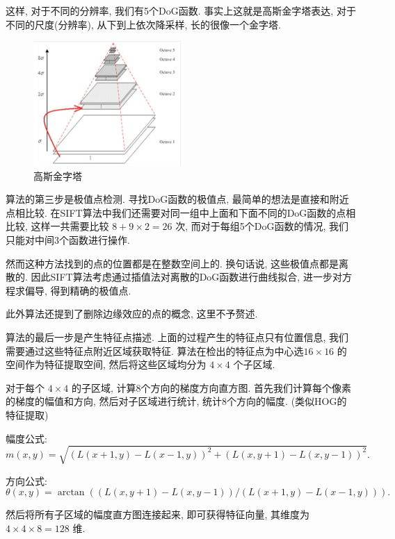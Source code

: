 \documentclass[lang=cn,12pt,a4paper,cite=authoryear]{elegantpaper}
\begin{document}
这样, 对于不同的分辨率, 我们有5个DoG函数. 事实上这就是高斯金字塔表达, 对于不同的尺度(分辨率), 从下到上依次降采样, 长的很像一个金字塔.
\begin{figure}[h]
    \centering
    \includegraphics[width=0.5\textwidth]{lateximgs/1.png}
    \caption{高斯金字塔}
    \label{fig:example}
\end{figure}

算法的第三步是极值点检测. 寻找DoG函数的极值点, 最简单的想法是直接和附近点相比较. 在SIFT算法中我们还需要对同一组中上面和下面不同的DoG函数的点相比较, 这样一共需要比较 $8+9\times2=26$ 次, 而对于每组5个DoG函数的情况, 我们只能对中间3个函数进行操作.

然而这种方法找到的点的位置都是在整数空间上的. 换句话说, 这些极值点都是离散的. 因此SIFT算法考虑通过插值法对离散的DoG函数进行曲线拟合, 进一步对方程求偏导, 得到精确的极值点.

此外算法还提到了删除边缘效应的点的概念, 这里不予赘述.

算法的最后一步是产生特征点描述. 上面的过程产生的特征点只有位置信息, 我们需要通过这些特征点附近区域获取特征. 算法在检出的特征点为中心选$16\times16$ 的空间作为特征提取空间, 然后将这些区域均分为 $4 \times 4$ 个子区域. 

对于每个 $4 \times 4$ 的子区域, 计算8个方向的梯度方向直方图. 首先我们计算每个像素的梯度的幅值和方向, 然后对子区域进行统计, 统计8个方向的幅度. (类似HOG的特征提取)

幅度公式:
\begin{equation*}
    m(x, y) = \sqrt{\left(L(x+1, y)-L(x-1, y)\right)^2+\left(L(x, y+1)-L(x, y-1)\right)^2}.
\end{equation*}

方向公式:
\begin{equation*}
    \theta(x, y) = \arctan\left((L(x, y+1)-L(x, y-1))/(L(x+1, y)-L(x-1, y))\right).
\end{equation*}

然后将所有子区域的幅度直方图连接起来, 即可获得特征向量, 其维度为 $4 \times 4 \times 8 = 128$ 维.
\end{document}
